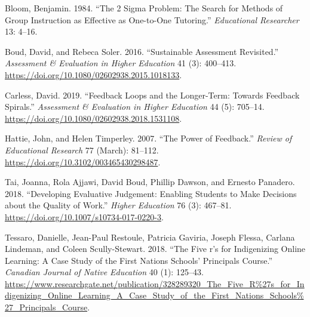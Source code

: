 \documentclass[
  letterpaper,
  DIV=11,
  numbers=noendperiod]{scrartcl}
\newlength{\cslhangindent}
\newenvironment{CSLReferences}[2] %
 {\begin{list}{}{%
  \setlength{\itemindent}{0pt}
  \setlength{\leftmargin}{0pt}
  \setlength{\parsep}{0pt}
  \ifodd #1
   \setlength{\leftmargin}{\cslhangindent}
   \setlength{\itemindent}{-1\cslhangindent}
  \fi
  \setlength{\itemsep}{#2\baselineskip}}}
 {\end{list}}
\begin{document}
\label{refs}
\begin{CSLReferences}{1}{0}
Bloom, Benjamin. 1984. {``The 2 Sigma Problem: The Search for Methods of
Group Instruction as Effective as One-to-One Tutoring.''}
\emph{Educational Researcher} 13: 4--16.

Boud, David, and Rebeca Soler. 2016. {``Sustainable Assessment
Revisited.''} \emph{Assessment \& Evaluation in Higher Education} 41
(3): 400--413. \url{https://doi.org/10.1080/02602938.2015.1018133}.

Carless, David. 2019. {``Feedback Loops and the Longer-Term: Towards
Feedback Spirals.''} \emph{Assessment \& Evaluation in Higher Education}
44 (5): 705--14. \url{https://doi.org/10.1080/02602938.2018.1531108}.

Hattie, John, and Helen Timperley. 2007. {``The Power of Feedback.''}
\emph{Review of Educational Research} 77 (March): 81--112.
\url{https://doi.org/10.3102/003465430298487}.

Tai, Joanna, Rola Ajjawi, David Boud, Phillip Dawson, and Ernesto
Panadero. 2018. {``Developing Evaluative Judgement: Enabling Students to
Make Decisions about the Quality of Work.''} \emph{Higher Education} 76
(3): 467--81. \url{https://doi.org/10.1007/s10734-017-0220-3}.

Tessaro, Danielle, Jean-Paul Restoule, Patricia Gaviria, Joseph Flessa,
Carlana Lindeman, and Coleen Scully-Stewart. 2018. {``The Five r's for
Indigenizing Online Learning: A Case Study of the First Nations Schools'
Principals Course.''} \emph{Canadian Journal of Native Education} 40
(1): 125--43.
\url{https://www.researchgate.net/publication/328289320_The_Five_R\%27s_for_Indigenizing_Online_Learning_A_Case_Study_of_the_First_Nations_Schools\%27_Principals_Course}.

\end{CSLReferences}
\end{document}
